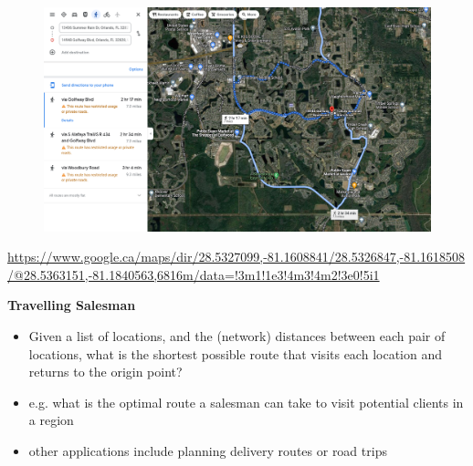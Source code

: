 \documentclass[aspectratio=169]{beamer}
\begin{document}
\begin{frame}
	
	\begin{figure}
		\centering
		\includegraphics[width=0.95 \linewidth]{images/stupid_route_orlando}
	\end{figure}
	\tiny \url{https://www.google.ca/maps/dir/28.5327099,-81.1608841/28.5326847,-81.1618508/@28.5363151,-81.1840563,6816m/data=!3m1!1e3!4m3!4m2!3e0!5i1}
\end{frame}




\begin{frame}
	
	
	\textbf{Travelling Salesman}
	
	\begin{itemize}
		\item 	Given a list of locations, and the (network) distances between each pair of locations, what is the shortest possible route that visits each location and returns to the origin point?
		\item e.g. what is the optimal route a salesman can take to visit potential clients in a region 
		\item other applications include planning delivery routes or road trips
	\end{itemize}
	
\end{frame}
\end{document}
